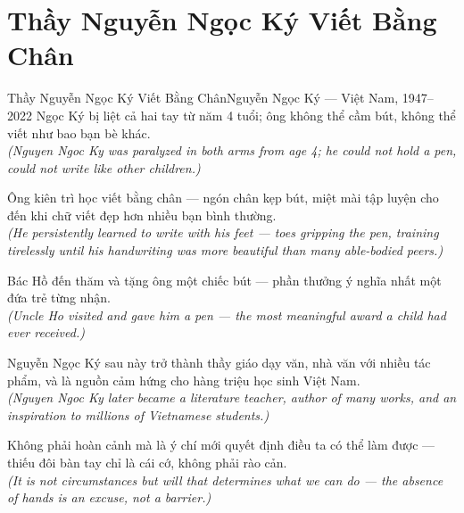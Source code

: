 \section{Thầy Nguyễn Ngọc Ký Viết Bằng Chân}
\begin{truyen}{Thầy Nguyễn Ngọc Ký Viết Bằng Chân}{Nguyễn Ngọc Ký --- Việt Nam, 1947--2022}
 Ngọc Ký bị liệt cả hai tay từ năm 4 tuổi; ông không thể cầm bút, không thể viết như bao bạn bè khác.\\[4pt]
\textit{(Nguyen Ngoc Ky was paralyzed in both arms from age 4; he could not hold a pen, could not write like other children.)}

Ông kiên trì học viết bằng chân --- ngón chân kẹp bút, miệt mài tập luyện cho đến khi chữ viết đẹp hơn nhiều bạn bình thường.\\[4pt]
\textit{(He persistently learned to write with his feet --- toes gripping the pen, training tirelessly until his handwriting was more beautiful than many able-bodied peers.)}

Bác Hồ đến thăm và tặng ông một chiếc bút --- phần thưởng ý nghĩa nhất một đứa trẻ từng nhận.\\[4pt]
\textit{(Uncle Ho visited and gave him a pen --- the most meaningful award a child had ever received.)}

Nguyễn Ngọc Ký sau này trở thành thầy giáo dạy văn, nhà văn với nhiều tác phẩm, và là nguồn cảm hứng cho hàng triệu học sinh Việt Nam.\\[4pt]
\textit{(Nguyen Ngoc Ky later became a literature teacher, author of many works, and an inspiration to millions of Vietnamese students.)}

\end{truyen}
\begin{baihoc}
  Không phải hoàn cảnh mà là ý chí mới quyết định điều ta có thể làm được --- thiếu đôi bàn tay chỉ là cái cớ, không phải rào cản.\\[4pt]
  \textit{(It is not circumstances but will that determines what we can do --- the absence of hands is an excuse, not a barrier.)}
\end{baihoc}
